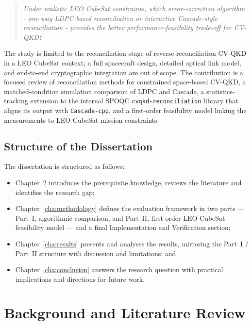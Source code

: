 \documentclass{UoYCSproject}
\begin{document}
\begin{quote}
\textit{Under realistic LEO CubeSat constraints, which error-correction
algorithm - one-way LDPC-based reconciliation or interactive Cascade-style
reconciliation - provides the better performance-feasibility trade-off
for CV-QKD?}
\end{quote}

\noindent The study is limited to the reconciliation stage of
reverse-reconciliation CV-QKD in a LEO CubeSat context; a full spacecraft
design, detailed optical link model, and end-to-end cryptographic integration
are out of scope. The contribution is a focused review of reconciliation
methods for constrained space-based CV-QKD, a matched-condition simulation
comparison of LDPC and Cascade, a statistics-tracking extension to the
internal SPOQC \texttt{cvqkd-reconciliation} library that aligns its output
with \texttt{Cascade-cpp}, and a first-order feasibility model linking the
measurements to LEO CubeSat mission constraints.

\section{Structure of the Dissertation}
\label{sec:structure}

The dissertation is structured as follows:
\begin{itemize}
    \item Chapter~\ref{cha:background} introduces the prerequisite knowledge,
    reviews the literature and identifies the research gap;
    \item Chapter~\ref{cha:methodology} defines the evaluation framework in
    two parts --- Part~I, algorithmic comparison, and
    Part~II, first-order LEO CubeSat feasibility model --- and a final
    Implementation and Verification section;
    \item Chapter~\ref{cha:results} presents and analyses the results,
    mirroring the Part~I / Part~II structure with discussion and limitations; and
    \item Chapter~\ref{cha:conclusion} answers the research question with
    practical implications and directions for future work.
\end{itemize}

\chapter{Background and Literature Review}
\label{cha:background}
\end{document}
